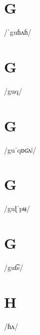\documentclass[10pt,a4paper,twoside]{book}
\begin{document}
\section*{G}

\begin{multicols}{3}
 {/ˈguɦʌɦ/} {}
\end{multicols}

\section*{G}

\begin{multicols}{3}
 {/guq/} {}
\end{multicols}

\section*{G}

\begin{multicols}{3}
 {/guˈqɒʛʌǀ/} {}
\end{multicols}

\section*{G}

\begin{multicols}{3}
 {/guɭˈpʉ/} {}
\end{multicols}

\section*{G}

\begin{multicols}{3}
 {/gut͡s/} {}
\end{multicols}

\section*{H}

\begin{multicols}{3}
 {/ɦʌ/} {}
\end{multicols}
\end{document}
